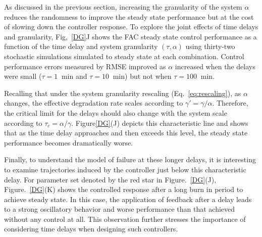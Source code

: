 \documentclass[12pt]{iopart}
\begin{document}
As discussed in the previous section, increasing the granularity of the system $\alpha$ reduces the randomness to improve the steady state performance but at the cost of slowing down the controller response.  To explore the joint effects of time delays and granularity, Fig,\ \ref{DG}J shows the FAC steady state control performance as a function of the time delay and system granularity $(\tau,\alpha)$ using thirty-two stochastic simulations simulated to steady state at each combination. Control performance errors measured by RMSE improved as $\alpha$ increased when the delays were small ($\tau=1 \ $ min and $\tau=10 \ $ min) but not when $\tau=100 \ $ min. 

Recalling that under the system granularity rescaling (Eq.\ \ref{eq:rescaling}), as $\alpha$ changes, the effective degradation rate scales according to $\gamma' = \gamma/\alpha$.  Therefore, the critical limit for the delays should also change with the system scale according to $\tau_c = \alpha/\gamma$. Figure\ref{DG}(J) depicts this characteristic line and shows that as the time delay approaches and then exceeds this level, the steady state performance becomes dramatically worse. 

Finally, to understand the model of failure at these longer delays, it is interesting to examine trajectories induced by the controller just below this characteristic delay. For parameter set denoted by the red star in Figure.\ \ref {DG}(J), Figure.\ \ref {DG}(K) shows the controlled response after a long burn in period to achieve steady state. In this case, the application of feedback after a delay leads to a strong oscillatory behavior and worse performance than that achieved without any control at all. This observation further stresses the importance of considering time delays when designing such controllers.
\end{document}
